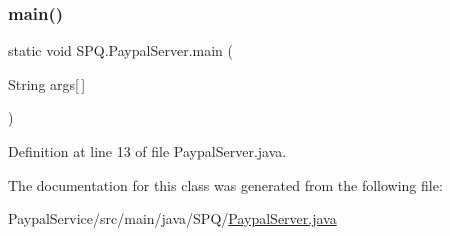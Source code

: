 \subsubsection{\texorpdfstring{main()}{main()}}
{\footnotesize\ttfamily static void S\+P\+Q.\+Paypal\+Server.\+main (\begin{DoxyParamCaption}\item[{String}]{args\mbox{[}$\,$\mbox{]} }\end{DoxyParamCaption})\hspace{0.3cm}{\ttfamily [static]}}



Definition at line 13 of file Paypal\+Server.\+java.



The documentation for this class was generated from the following file\+:\begin{DoxyCompactItemize}
\item 
Paypal\+Service/src/main/java/\+S\+P\+Q/\mbox{\hyperlink{_paypal_server_8java}{Paypal\+Server.\+java}}\end{DoxyCompactItemize}
